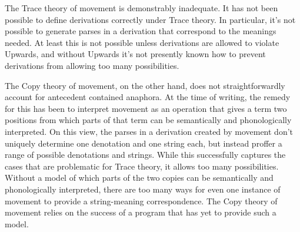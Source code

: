 The Trace theory of movement is demonstrably inadequate. It has not been possible to define derivations correctly under Trace theory. In particular, it's not possible to generate parses in a derivation that correspond to the meanings needed. At least this is not possible unless derivations are allowed to violate Upwards, and without Upwards it's not presently known how to prevent derivations from allowing too many possibilities. 

The Copy theory of movement, on the other hand, does not straightforwardly account for antecedent contained anaphora. At the time of writing, the remedy for this has been to interpret movement as an operation that gives a term two positions from which parts of that term can be semantically and phonologically interpreted. On this view, the parses in a derivation created by movement don't uniquely determine one denotation and one string each, but instead proffer a range of possible denotations and strings. While this successfully captures the cases that are problematic for Trace theory, it allows too many possibilities. Without a model of which parts of the two copies can be semantically and phonologically interpreted, there are too many ways for even one instance of movement to provide a string-meaning correspondence. The Copy theory of movement relies on the success of a program that has yet to provide such a model.


